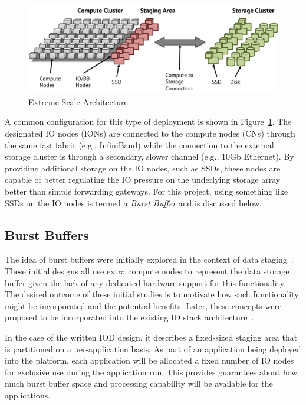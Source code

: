 \documentclass[conference]{IEEEtran}
\begin{document}
\begin{figure}[htbp]
\centering
\vspace{-0.10in}
\includegraphics[width=\columnwidth]{images/exa-arch.png}
\vspace{-0.20in}
\caption{Extreme Scale Architecture}
\label{fig:exa-arch}
\vspace{-0.10in}
\end{figure}

A common configuration for this type of deployment is shown in
Figure~\ref{fig:exa-arch}. The designated IO nodes (IONs) are connected to the
compute nodes (CNs) through the same fast fabric (e.g., InfiniBand) while the
connection to the external storage cluster is through a secondary, slower
channel (e.g., 10Gb Ethernet). By providing additional storage on the IO nodes,
such as SSDs, these nodes are capable of better regulating the IO pressure on
the underlying storage array better than simple forwarding gateways. For this
project, using something like SSDs on the IO nodes is termed a {\em Burst
Buffer} and is discussed below.

\subsection{Burst Buffers}
\label{sec:burst}

The idea of burst buffers were initially explored in the context of data
staging~\cite{abbasi:2007:datatap,Abbasi:2009:datatap,nisar:2008:staging,zheng:2010:predata}.
These initial designs all use extra compute nodes to represent the data storage
buffer given the lack of any dedicated hardware support for this functionality.
The desired outcome of these initial studies is to motivate how such
functionality might be incorporated and the potential benefits.  Later, these
concepts were proposed to be incorporated into the existing IO stack
architecture~\cite{nowoczynski:2008:zest,bent:2012:challenges,bent:2012:burst-buffer}.

In the case of the written IOD design, it describes a fixed-sized staging area
that is partitioned on a per-application basis. As part of an application
being deployed into the platform, each application will be allocated a fixed
number of IO nodes for exclusive use during the application run. This provides
guarantees about how much burst buffer space and processing capability will be
available for the applications.
\end{document}

